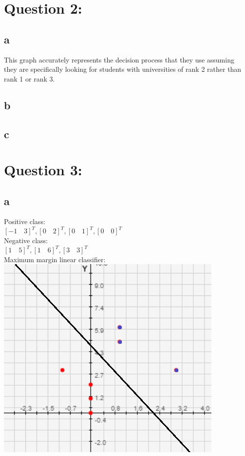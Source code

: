\documentclass[11pt, oneside]{article}   	%
\begin{document}
\begin{flushleft}
\section*{Question 2:}
\subsection*{a}
This graph accurately represents the decision process that they use assuming they are specifically looking for students with universities of rank 2 rather than rank 1 or rank 3.
\subsection*{b}

\subsection*{c}

\section*{Question 3:}
\subsection*{a}
Positive class: \\
$[-1\quad3]^T ,[0\quad2]^T ,[0\quad1]^T ,[0\quad0]^T $\\
Negative class: \\
$[1\quad5]^T ,[1\quad6]^T ,[3\quad3]^T $\\
Maximum margin linear classifier:\\
\includegraphics[]{q3_1.png}

\end{flushleft}
\end{document}
